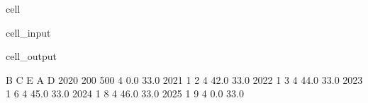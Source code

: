\documentclass[letterpaper,10pt,english]{jupyterBook}
\begin{document}
\begin{sphinxuseclass}{cell}\begin{sphinxVerbatimInput}

\begin{sphinxuseclass}{cell_input}
\begin{sphinxVerbatim}[commandchars=\\\{\}]
\end{sphinxVerbatim}

\end{sphinxuseclass}\end{sphinxVerbatimInput}
\begin{sphinxVerbatimOutput}

\begin{sphinxuseclass}{cell_output}
\begin{sphinxVerbatim}[commandchars=\\\{\}]
        B    C  E     A     D
2020  200  500  4   0.0  33.0
2021    1    2  4  42.0  33.0
2022    1    3  4  44.0  33.0
2023    1    6  4  45.0  33.0
2024    1    8  4  46.0  33.0
2025    1    9  4   0.0  33.0
\end{sphinxVerbatim}

\end{sphinxuseclass}\end{sphinxVerbatimOutput}

\end{sphinxuseclass}
\end{document}
